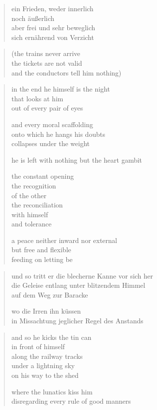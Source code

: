 {\begin{verse}
ein Frieden, weder innerlich\\
noch äußerlich\\
aber frei und sehr beweglich\\
sich ernährend von Verzicht
\end{verse}

\clearpage

\begin{quote}
(the trains never arrive\\
the tickets are not valid\\
and the conductors tell him nothing)
\end{quote}

\vspace*{\onelineskip}
\begin{verse}
in the end he himself is the night\\
that looks at him\\
out of every pair of eyes

and every moral scaffolding\\
onto which he hangs his doubts\\
collapses under the weight

he is left with nothing but the heart gambit

the constant opening\\
the recognition\\
of the other\\
the reconciliation\\
with himself\\
and tolerance

a peace neither inward nor external\\
but free and flexible\\
feeding on letting be
\end{verse}

\clearpage

\begin{verse}
und so tritt er die blecherne Kanne vor sich her\\
die Geleise entlang unter blitzendem Himmel\\
auf dem Weg zur Baracke

wo die Irren ihn küssen\\
in Missachtung jeglicher Regel des Anstands
\end{verse}

\clearpage

\begin{verse}
and so he kicks the tin can\\
in front of himself\\
along the railway tracks\\
under a lightning sky\\
on his way to the shed

where the lunatics kiss him\\
disregarding every rule of good manners
\end{verse}

}
